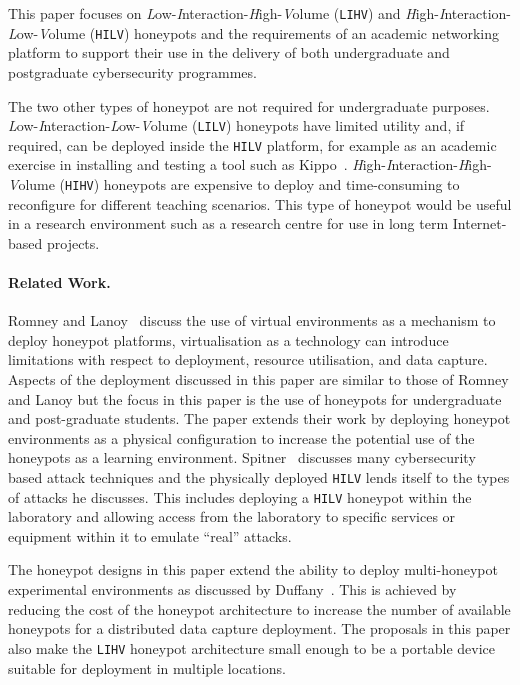 \documentclass{llncs}
\begin{document}
This paper focuses on \emph{L}ow-\emph{I}nteraction-\emph{H}igh-\emph{V}olume
(\texttt{LIHV}) and \emph{H}igh-\emph{I}nteraction-\emph{L}ow-\emph{V}olume
(\texttt{HILV}) honeypots and the requirements of an academic networking
platform to support their use in the delivery of both undergraduate and
postgraduate cybersecurity programmes.

The two other types of honeypot are not required for undergraduate purposes.
\emph{L}ow-\emph{I}nteraction-\emph{L}ow-\emph{V}olume (\texttt{LILV})
honeypots have limited utility and, if required,  can be deployed inside the
\texttt{HILV} platform, for example as an academic exercise in installing and
testing a tool such as Kippo~\cite{D:16,SH:15}.
\emph{H}igh-\emph{I}nteraction-\emph{H}igh-\emph{V}olume (\texttt{HIHV})
honeypots are expensive to deploy and time-consuming to reconfigure for
different teaching scenarios. This type of honeypot would be useful in a
research environment such as a research centre for use in long term
Internet-based projects. 

\paragraph{Related Work.}
Romney and Lanoy~\cite{LR:06} discuss the use of virtual environments as a
mechanism to deploy honeypot platforms, virtualisation as a technology can
introduce limitations with respect to deployment, resource utilisation, and
data capture. Aspects of the deployment discussed in this paper are similar to
those of Romney and Lanoy but the focus in this paper is the use of honeypots
for undergraduate and post-graduate students. The paper extends their work by
deploying honeypot environments as a physical configuration to increase the
potential use of the honeypots as a learning environment. Spitner~\cite{LS:03}
discusses many cybersecurity based attack techniques and the physically
deployed \texttt{HILV} lends itself to the types of attacks he discusses. This
includes deploying a \texttt{HILV} honeypot within the laboratory and allowing
access from the laboratory to specific services or equipment within it to
emulate ``real'' attacks.

The honeypot designs in this paper extend the ability to deploy multi-honeypot
experimental environments as discussed by Duffany~\cite{JD:08}. This is
achieved by reducing the cost of the honeypot architecture to increase the
number of available honeypots for a distributed data capture deployment. The
proposals in this paper also make the \texttt{LIHV} honeypot architecture small
enough to be a portable device suitable for deployment in multiple locations.
\end{document}
